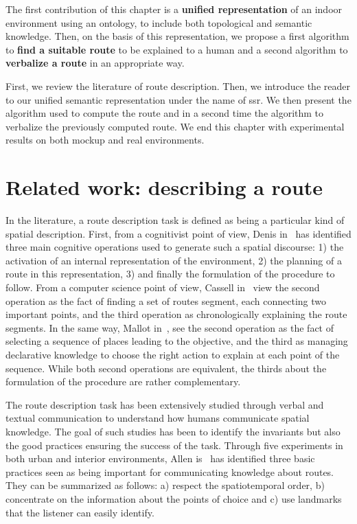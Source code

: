 The first contribution of this chapter is a \textbf{unified representation} of an indoor environment using an ontology, to include both topological and semantic knowledge. Then, on the basis of this representation, we propose a first algorithm to \textbf{find a suitable route} to be explained to a human and a second algorithm to \textbf{verbalize a route} in an appropriate way.

First, we review the literature of route description. Then, we introduce the reader to our unified semantic representation under the name of \acrfull{ssr}. We then present the algorithm used to compute the route and in a second time the algorithm to verbalize the previously computed route. We end this chapter with experimental results on both mockup and real environments.

\section[Related work]{Related work: describing a route}


In the literature, a route description task is defined as being a particular kind of spatial description. First, from a cognitivist point of view, Denis in~\cite{denis_1997_description} has identified three main cognitive operations used to generate such a spatial discourse: 1) the activation of an internal representation of the environment, 2) the planning of a route in this representation, 3) and finally the formulation of the procedure to follow. From a computer science point of view, Cassell in~\cite{cassell_2007_trading} view the second operation as the fact of finding a set of routes segment, each connecting two important points, and the third operation as chronologically explaining the route segments. In the same way, Mallot in~\cite{mallot_2009_embodied}, see the second operation as the fact of selecting a sequence of places leading to the objective, and the third as managing declarative knowledge to choose the right action to explain at each point of the sequence. While both second operations are equivalent, the thirds about the formulation of the procedure are rather complementary.

The route description task has been extensively studied through verbal and textual communication to understand how humans communicate spatial knowledge. The goal of such studies has been to identify the invariants but also the good practices ensuring the success of the task. Through five experiments in both urban and interior environments, Allen is~\cite{allen_2000_principles} has identified three basic practices seen as being important for communicating knowledge about routes. They can be summarized as follows: a) respect the spatiotemporal order, b) concentrate on the information about the points of choice and c) use landmarks that the listener can easily identify.

